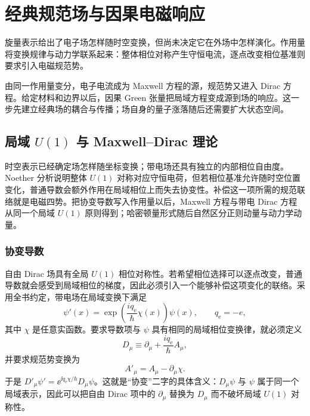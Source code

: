 \chapter{经典规范场与因果电磁响应}\label{chap:classical-gauge-response}

旋量表示给出了电子场怎样随时空变换，但尚未决定它在外场中怎样演化。作用量将变换规律与动力学联系起来：整体相位对称产生守恒电流，逐点改变相位基准则要求引入电磁规范势。

由同一作用量变分，电子电流成为 Maxwell 方程的源，规范势又进入 Dirac 方程。给定材料和边界以后，因果 Green 张量把局域方程变成源到场的响应。这一步先建立经典场的耦合与传播；场自身的量子涨落随后还需要扩大状态空间。




\section{局域 $U(1)$ 与 Maxwell--Dirac 理论}

时空表示已经确定场怎样随坐标变换；带电场还具有独立的内部相位自由度。Noether 分析说明整体 $U(1)$ 对称对应守恒电荷，但若相位基准允许随时空位置变化，普通导数会额外作用在局域相位上而失去协变性。补偿这一项所需的规范联络就是电磁四势。把协变导数写入作用量以后，Maxwell 方程与带电 Dirac 方程从同一个局域 $U(1)$ 原则得到；哈密顿量形式随后自然区分正则动量与动力学动量。

\subsection{协变导数}

自由 Dirac 场具有全局 $U(1)$ 相位对称性。若希望相位选择可以逐点改变，普通导数就会感受到局域相位的梯度，因此必须引入一个能够补偿这项变化的联络。采用全书约定，带电场在局域变换下满足
\begin{equation*}
\psi'(x)=\exp\!\left(\frac{i q_{\mathrm e}}{\hbar}\chi(x)\right)\psi(x),
\qquad q_{\mathrm e}=-e,
\end{equation*}
其中 $\chi$ 是任意实函数。要求导数项与 $\psi$ 具有相同的局域相位变换律，就必须定义
\begin{equation}
{D_\mu\equiv\partial_\mu+\frac{i q_{\mathrm e}}{\hbar}A_\mu,}
\label{eq:covariant-derivative}
\end{equation}
并要求规范势变换为
\begin{equation}
A'_\mu=A_\mu-\partial_\mu\chi.
\label{eq:gauge-A-lower}
\end{equation}
于是 $D'_\mu\psi'=\ee^{\ii q_{\mathrm e}\chi/\hbar}D_\mu\psi$。这就是“协变”二字的具体含义：$D_\mu\psi$ 与 $\psi$ 属于同一个局域表示，因此可以把自由 Dirac 项中的 $\partial_\mu$ 替换为 $D_\mu$ 而不破坏局域 $U(1)$ 对称性。

